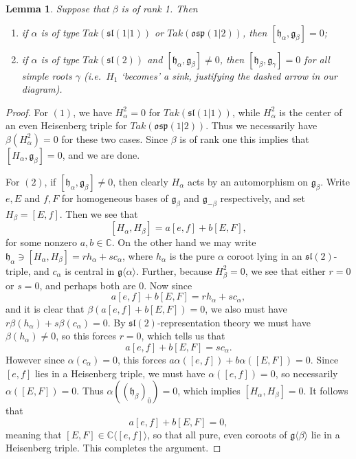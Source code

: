 \documentclass[12pt, a4paper, reqno]{amsart}
\def\C{\mathbb{C}}
\def\p{\mathfrak{p}}
\def\g{\mathfrak{g}}
\def\h{\mathfrak{h}}
\def\l{\mathfrak{l}}
\def\s{\mathfrak{s}}
\def\o{\mathfrak{o}}
\def\ol{\overline}
\newtheorem{lemma}{Lemma}
\theoremstyle{definition}
\theoremstyle{definition}
\theoremstyle{definition}
\numberwithin{theorem}{section}
\numberwithin{lemma}{section}
\numberwithin{remark}{section}
\numberwithin{definition}{section}
\numberwithin{corollary}{section}
\numberwithin{proposition}{section}
\numberwithin{example}{section}
\begin{document}
	\begin{lemma}\label{lemma_conn_tak}
		Suppose that $\beta$ is of rank 1.  Then 
		\begin{enumerate}
			\item if $\alpha$ is of type $Tak(\s\l(1|1))$ or $Tak(\o\s\p(1|2))$, then $[\h_{\alpha},\g_{\beta}]=0$;
			\item if $\alpha$ is of type $Tak(\s\l(2))$ and $[\h_{\alpha},\g_{\beta}]\neq0$, then $[\h_{\beta},\g_{\gamma}]=0$ for all simple roots $\gamma$ (i.e.~$H_1$ `becomes' a sink, justifying the dashed arrow in our diagram).
		\end{enumerate}
	\end{lemma}
	
	\begin{proof}
		For $(1)$, we have $H_{\alpha}^2=0$ for $Tak(\s\l(1|1))$, while $H_{\alpha}^2$ is the center of an even Heisenberg triple for $Tak(\o\s\p(1|2))$.  Thus we necessarily have $\beta(H_{\alpha}^2)=0$ for these two cases. Since $\beta$ is of rank one this implies that $[H_{\alpha},\g_{\beta}]=0$, and we are done.
		
		For $(2)$, if $[\h_{\alpha},\g_{\beta}]\neq0$, then clearly $H_{\alpha}$ acts by an automorphism on $\g_{\beta}$. Write $e,E$ and $f,F$ for homogeneous bases of $\g_{\beta}$ and $\g_{-\beta}$ respectively, and set $H_{\beta}=[E,f]$.  Then we see that
		\[
		[H_{\alpha},H_{\beta}]=a[e,f]+b[E,F],
		\] 
		for some nonzero $a,b\in\C$.  On the other hand we may write $\h_{\alpha}\ni[H_{\alpha},H_{\beta}]=rh_{\alpha}+sc_{\alpha}$, where $h_{\alpha}$ is the pure $\alpha$ coroot lying in an $\s\l(2)$-triple, and $c_{\alpha}$ is central in $\g\langle\alpha\rangle$. Further, because $H_{\beta}^2=0$, we see that either $r=0$ or $s=0$, and perhaps both are 0.  Now since
		\[
		a[e,f]+b[E,F]=rh_{\alpha}+sc_{\alpha},
		\]  
		and it is clear that $\beta(a[e,f]+b[E,F])=0$, we also must have $r\beta(h_{\alpha})+s\beta(c_{\alpha})=0$.  By $\s\l(2)$-representation theory we must have $\beta(h_{\alpha})\neq0$, so this forces $r=0$, which tells us that
		\[
		a[e,f]+b[E,F]=sc_{\alpha}.
		\] 
		However since $\alpha(c_{\alpha})=0$, this forces $a\alpha([e,f])+b\alpha([E,F])=0$.  Since $[e,f]$ lies in a Heisenberg triple, we must have $\alpha([e,f])=0$, so necessarily $\alpha([E,F])=0$.  Thus $\alpha((\h_{\beta})_{\ol{0}})=0$, which implies $[H_{\alpha},H_{\beta}]=0$.  It follows that
		\[
		a[e,f]+b[E,F]=0,
		\] 
		meaning that $[E,F]\in\C\langle[e,f]\rangle$, so that all pure, even coroots of  $\g\langle\beta\rangle$ lie in a Heisenberg triple.  This completes the argument.
	\end{proof}
\end{document}
